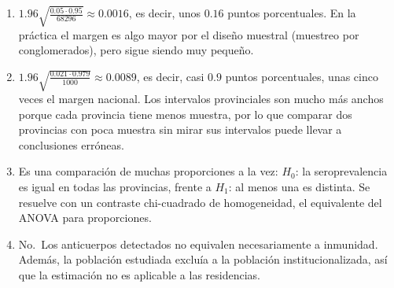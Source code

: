 \documentclass[
  spanish,
  a4paper,
]{scrreport}
\theoremstyle{definition}
\theoremstyle{remark}
\begin{document}
\begin{tcolorbox}[enhanced jigsaw, arc=.35mm, bottomrule=.15mm, bottomtitle=1mm, breakable, colback=white, colbacktitle=quarto-callout-tip-color!10!white, colframe=quarto-callout-tip-color-frame, coltitle=black, left=2mm, leftrule=.75mm, opacityback=0, opacitybacktitle=0.6, rightrule=.15mm, title=\textcolor{quarto-callout-tip-color}{\faLightbulb}\hspace{0.5em}{Solución}, titlerule=0mm, toprule=.15mm, toptitle=1mm]

\begin{enumerate}
\def\labelenumi{\alph{enumi}.}
\item
  \(1.96\sqrt{\frac{0.05\cdot 0.95}{68296}}\approx 0.0016\), es decir,
  unos \(0.16\) puntos porcentuales. En la práctica el margen es algo
  mayor por el diseño muestral (muestreo por conglomerados), pero sigue
  siendo muy pequeño.
\item
  \(1.96\sqrt{\frac{0.021\cdot 0.979}{1000}}\approx 0.0089\), es decir,
  casi \(0.9\) puntos porcentuales, unas cinco veces el margen nacional.
  Los intervalos provinciales son mucho más anchos porque cada provincia
  tiene menos muestra, por lo que comparar dos provincias con poca
  muestra sin mirar sus intervalos puede llevar a conclusiones erróneas.
\item
  Es una comparación de muchas proporciones a la vez: \(H_0\): la
  seroprevalencia es igual en todas las provincias, frente a \(H_1\): al
  menos una es distinta. Se resuelve con un contraste chi-cuadrado de
  homogeneidad, el equivalente del ANOVA para proporciones.
\item
  No.~Los anticuerpos detectados no equivalen necesariamente a
  inmunidad. Además, la población estudiada excluía a la población
  institucionalizada, así que la estimación no es aplicable a las
  residencias.
\end{enumerate}

\end{tcolorbox}
\end{document}
